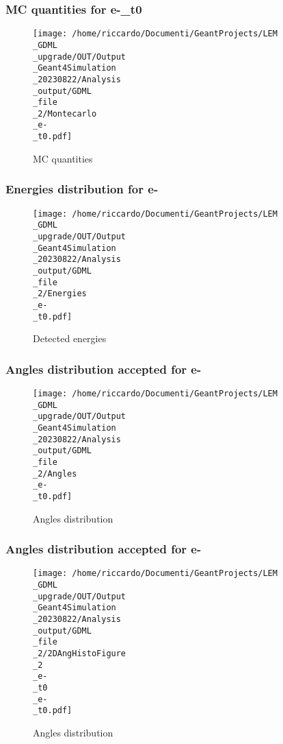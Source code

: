 \documentclass[8pt]{beamer}
\begin{document}
            \begin{frame}
                \frametitle{MC quantities for e-\_t0}
            
        \begin{figure}[h]
            \centering
            \texttt{[image: /home/riccardo/Documenti/GeantProjects/LEM\\\_GDML\\\_upgrade/OUT/Output\\\_Geant4Simulation\\\_20230822/Analysis\\\_output/GDML\\\_file\\\_2/Montecarlo\\\_e-\\\_t0.pdf]}
            \caption{MC quantities}
        \end{figure}
        
            \end{frame}
            
            \begin{frame}
                \frametitle{Energies distribution for e-}
            
        \begin{figure}[h]
            \centering
            \texttt{[image: /home/riccardo/Documenti/GeantProjects/LEM\\\_GDML\\\_upgrade/OUT/Output\\\_Geant4Simulation\\\_20230822/Analysis\\\_output/GDML\\\_file\\\_2/Energies\\\_e-\\\_t0.pdf]}
            \caption{Detected energies}
        \end{figure}
        
            \end{frame}
            
            \begin{frame}
                \frametitle{Angles distribution accepted for e-}
            
        \begin{figure}[h]
            \centering
            \texttt{[image: /home/riccardo/Documenti/GeantProjects/LEM\\\_GDML\\\_upgrade/OUT/Output\\\_Geant4Simulation\\\_20230822/Analysis\\\_output/GDML\\\_file\\\_2/Angles\\\_e-\\\_t0.pdf]}
            \caption{Angles distribution}
        \end{figure}
        
            \end{frame}
            
            \begin{frame}
                \frametitle{Angles distribution accepted for e-}
            
        \begin{figure}[h]
            \centering
            \texttt{[image: /home/riccardo/Documenti/GeantProjects/LEM\\\_GDML\\\_upgrade/OUT/Output\\\_Geant4Simulation\\\_20230822/Analysis\\\_output/GDML\\\_file\\\_2/2DAngHistoFigure\\\_2\\\_e-\\\_t0\\\_e-\\\_t0.pdf]}
            \caption{Angles distribution}
        \end{figure}
        
            \end{frame}
            
\end{document}
